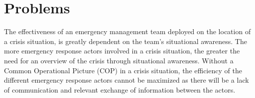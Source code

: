 \chapter{Problems}
\label{chap:problems}
The effectiveness of an emergency management team deployed on the location of a crisis situation, is greatly dependent on the team's situational awareness. The more emergency response actors involved in a crisis situation, the greater the need for an overview of the crisis through situational awareness. Without a Common Operational Picture (COP) in a crisis situation, the efficiency of the different emergency response actors cannot be maximized as there will be a lack of communication and relevant exchange of information between the actors.
